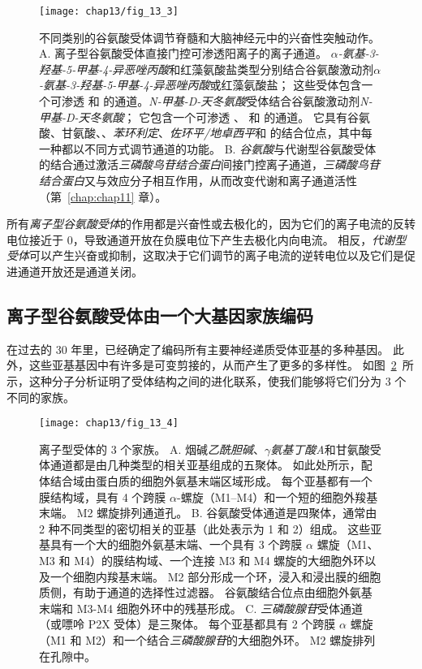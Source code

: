 \begin{figure}[htbp]
	\centering
	\texttt{[image: chap13/fig\_13\_3]}
	\caption{不同类别的谷氨酸受体调节脊髓和大脑神经元中的兴奋性突触动作。
		A. 离子型谷氨酸受体直接门控可渗透阳离子的离子通道。
		\textit{$\alpha$-氨基-3-羟基-5-甲基-4-异恶唑丙酸}和红藻氨酸盐类型分别结合谷氨酸激动剂\textit{$\alpha$-氨基-3-羟基-5-甲基-4-异恶唑丙酸}或红藻氨酸盐；
		这些受体包含一个可渗透  和  的通道。\textit{N-甲基-D-天冬氨酸}受体结合谷氨酸激动剂\textit{N-甲基-D-天冬氨酸}；
		它包含一个可渗透 、 和  的通道。
		它具有谷氨酸、甘氨酸、、\textit{苯环利定}、\textit{佐环平/地卓西平}和  的结合位点，其中每一种都以不同方式调节通道的功能。
		B. \textit{谷氨酸}与代谢型谷氨酸受体的结合通过激活\textit{三磷酸鸟苷结合蛋白}间接门控离子通道，\textit{三磷酸鸟苷结合蛋白}又与效应分子相互作用，从而改变代谢和离子通道活性（第~\ref{chap:chap11} 章）。}
	\label{fig:13_3}
\end{figure}


所有\textit{离子型谷氨酸受体}的作用都是兴奋性或去极化的，因为它们的离子电流的反转电位接近于 0，导致通道开放在负膜电位下产生去极化内向电流。
相反，\textit{代谢型受体}可以产生兴奋或抑制，这取决于它们调节的离子电流的逆转电位以及它们是促进通道开放还是通道关闭。



\subsection{离子型谷氨酸受体由一个大基因家族编码}

在过去的 30 年里，已经确定了编码所有主要神经递质受体亚基的多种基因。
此外，这些亚基基因中有许多是可变剪接的，从而产生了更多的多样性。
如图~\ref{fig:13_4}~所示，这种分子分析证明了受体结构之间的进化联系，使我们能够将它们分为 3 个不同的家族。


\begin{figure}[htbp]
	\centering
	\texttt{[image: chap13/fig\_13\_4]}
	\caption{离子型受体的 3 个家族。
		A. 烟碱\textit{乙酰胆碱}、\textit{$\gamma$氨基丁酸A}和甘氨酸受体通道都是由几种类型的相关亚基组成的五聚体。
		如此处所示，配体结合域由蛋白质的细胞外氨基末端区域形成。
		每个亚基都有一个膜结构域，具有 4 个跨膜 $\alpha$-螺旋（M1–M4）和一个短的细胞外羧基末端。
		M2 螺旋排列通道孔。
		B. 谷氨酸受体通道是四聚体，通常由 2 种不同类型的密切相关的亚基（此处表示为 1 和 2）组成。
		这些亚基具有一个大的细胞外氨基末端、一个具有 3 个跨膜 $\alpha$ 螺旋（M1、M3 和 M4）的膜结构域、一个连接 M3 和 M4 螺旋的大细胞外环以及一个细胞内羧基末端。
		M2 部分形成一个环，浸入和浸出膜的细胞质侧，有助于通道的选择性过滤器。
		谷氨酸结合位点由细胞外氨基末端和 M3-M4 细胞外环中的残基形成。
		C. \textit{三磷酸腺苷}受体通道（或嘌呤 P2X 受体）是三聚体。
		每个亚基都具有 2 个跨膜 $\alpha$ 螺旋（M1 和 M2）和一个结合\textit{三磷酸腺苷}的大细胞外环。
		M2 螺旋排列在孔隙中。}
	\label{fig:13_4}
\end{figure}


